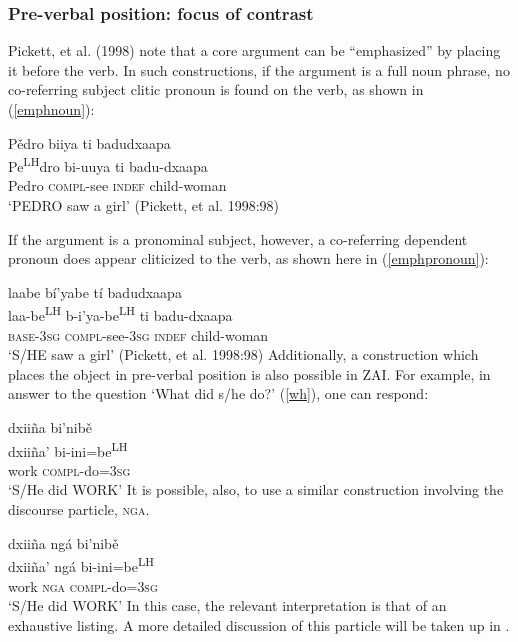 \z

\subsubsection{Pre-verbal position: focus of contrast}
Pickett, et al. (1998) note that a core argument can be ``emphasized'' by placing it before the verb. In such constructions, if the argument is a full noun phrase, no co-referring subject clitic pronoun is found on the verb, as shown in (\ref{emphnoun}):

\ea\label{emphnoun}
\glll P\v{e}dro biiya ti badudxaapa \\		
Pe\textsuperscript{LH}dro bi-uuya ti badu-dxaapa \\
Pedro \textsc{compl}-see \textsc{indef} child-woman \\
\glt `PEDRO saw a girl' \hfill (Pickett, et al. 1998:98)

\z
If the argument is a pronominal subject, however, a co-referring dependent pronoun does appear cliticized to the verb, as shown here in (\ref{emphpronoun}):

\ea\label{emphpronoun}
\glll laabe b\'{i}'yabe t\'{i} badudxaapa \\		
laa-be\textsuperscript{LH} b-i'ya-be\textsuperscript{LH} ti badu-dxaapa \\
\textsc{base}-3\textsc{sg} \textsc{compl}-see-3\textsc{sg} \textsc{indef} child-woman \\
\glt `S/HE saw a girl' \hfill (Pickett, et al. 1998:98)
\z
Additionally, a construction which places the object in pre-verbal position is also possible in ZAI. For example, in answer to the question `What did s/he do?' (\ref{wh}), one can respond:

\ea\label{preverbalobj}
\glll dxiiña bi'nib\v{e} \\
dxiiña' bi-ini=be\textsuperscript{LH} \\
work \textsc{compl}-do=\textsc{3sg} \\
\glt `S/He did WORK'
\z 
It is possible, also, to use a similar construction involving the discourse particle, \textsc{nga}.  

\ea\label{preverbalnga}
\glll dxiiña ng\'{a} bi'nib\v{e} \\
dxiiña' ng\'{a} bi-ini=be\textsuperscript{LH} \\
work \textsc{nga} \textsc{compl}-do=\textsc{3sg} \\
\glt `S/He did WORK'
\z 
In this case, the relevant interpretation is that of an exhaustive listing. A more detailed discussion of this particle will be taken up in .

